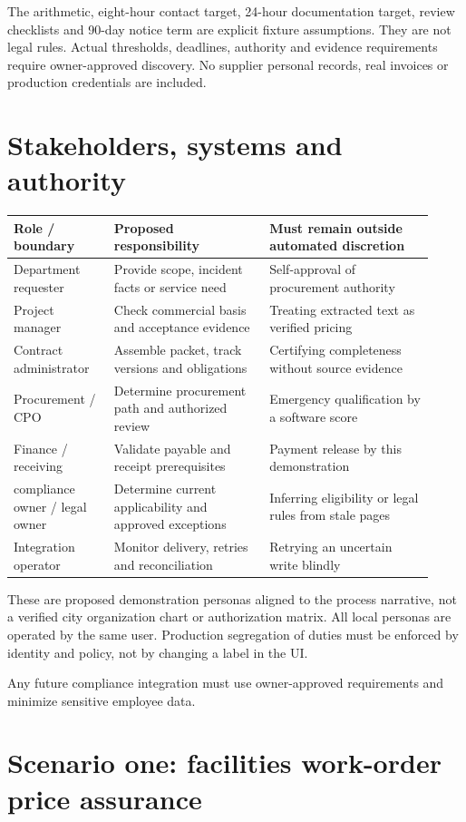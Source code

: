 \documentclass[11pt,letterpaper]{article}
\begin{document}
The arithmetic, eight-hour contact target, 24-hour documentation target, review checklists and 90-day notice term are explicit fixture assumptions. They are not legal rules. Actual thresholds, deadlines, authority and evidence requirements require owner-approved discovery. No supplier personal records, real invoices or production credentials are included.

\section{Stakeholders, systems and authority}
\begin{longtable}{p{0.22\linewidth}p{0.34\linewidth}p{0.36\linewidth}}
\toprule Role / boundary & Proposed responsibility & Must remain outside automated discretion\\\midrule
Department requester & Provide scope, incident facts or service need & Self-approval of procurement authority\\
Project manager & Check commercial basis and acceptance evidence & Treating extracted text as verified pricing\\
Contract administrator & Assemble packet, track versions and obligations & Certifying completeness without source evidence\\
Procurement / CPO & Determine procurement path and authorized review & Emergency qualification by a software score\\
Finance / receiving & Validate payable and receipt prerequisites & Payment release by this demonstration\\
compliance owner / legal owner & Determine current applicability and approved exceptions & Inferring eligibility or legal rules from stale pages\\
Integration operator & Monitor delivery, retries and reconciliation & Retrying an uncertain write blindly\\
\bottomrule
\end{longtable}
These are proposed demonstration personas aligned to the process narrative, not a verified city organization chart or authorization matrix. All local personas are operated by the same user. Production segregation of duties must be enforced by identity and policy, not by changing a label in the UI.

Any future compliance integration must use owner-approved requirements and minimize sensitive employee data.

\section{Scenario one: facilities work-order price assurance}
\end{document}
